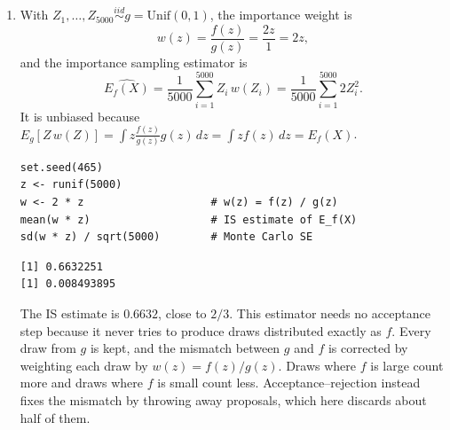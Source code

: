 \documentclass[11pt]{article}
\begin{document}
\begin{enumerate}
\item With $Z_1,\dots,Z_{5000} \overset{iid}{\sim} g = \text{Unif}(0,1)$, the importance weight is
\[
w(z) = \frac{f(z)}{g(z)} = \frac{2z}{1} = 2z,
\]
and the importance sampling estimator is
\[
\widehat{E_f(X)} = \frac{1}{5000}\sum_{i=1}^{5000} Z_i\, w(Z_i) = \frac{1}{5000}\sum_{i=1}^{5000} 2Z_i^2 .
\]
It is unbiased because $E_g[Z\,w(Z)] = \int z \frac{f(z)}{g(z)} g(z)\,dz = \int z f(z)\,dz = E_f(X)$.
\begin{lstlisting}
set.seed(465)
z <- runif(5000)
w <- 2 * z                    # w(z) = f(z) / g(z)
mean(w * z)                   # IS estimate of E_f(X)
sd(w * z) / sqrt(5000)        # Monte Carlo SE
\end{lstlisting}
\begin{lstlisting}[style=out]
[1] 0.6632251
[1] 0.008493895
\end{lstlisting}
The IS estimate is $0.6632$, close to $2/3$.
This estimator needs no acceptance step because it never tries to produce draws distributed exactly as $f$. Every draw from $g$ is kept, and the mismatch between $g$ and $f$ is corrected by weighting each draw by $w(z) = f(z)/g(z)$. Draws where $f$ is large count more and draws where $f$ is small count less. Acceptance--rejection instead fixes the mismatch by throwing away proposals, which here discards about half of them.
\end{enumerate}
\end{document}
